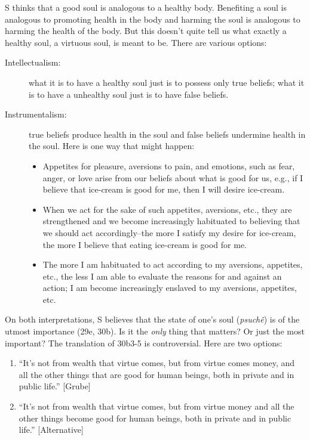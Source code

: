 \documentclass[oneside]{article}
\begin{document}
S thinks that a good soul is analogous to a healthy body. Benefiting a soul is analogous to promoting health in the body and harming the soul is analogous to harming the health of the body.  But this doesn't quite tell us what exactly a healthy soul, a virtuous soul, is meant to be. There are various options: 
\begin{description}
\item[Intellectualism:] what it is to have a healthy soul just is to possess only true beliefs; what it is to have a unhealthy soul just is to have false beliefs. 
\item[Instrumentalism:] true beliefs produce health in the soul and false beliefs undermine health in the soul. Here is one way that might happen:
\begin{itemize}
\item Appetites  for pleasure, aversions to pain, and emotions, such as fear, anger, or love arise from our beliefs about what is good for us, e.g., if I believe that ice-cream is good for me, then I will desire ice-cream. 
\item When we act for the sake of such appetites, aversions, etc., they are strengthened and we become increasingly habituated to believing that we should act accordingly--the  more I satisfy my desire for ice-cream, the more I believe that eating ice-cream is good for me.
\item The more I am habituated to act according to my aversions, appetites, etc., the less I am able to evaluate the reasons for and against an action; I am become increasingly enslaved to my aversions, appetites, etc. 
\end{itemize}
\end{description}
On both interpretations, S believes that the state of one's soul (\emph{psuch\^{e}}) is of the utmost importance (29e, 30b). Is it the \emph{only} thing that matters? Or just the most important? The translation of 30b3-5 is controversial. Here are two options:
\begin{enumerate}
\item ``It's not from wealth that virtue comes, but from virtue comes money, and all the other things that are good for human beings, both in private and in public life.'' [Grube]
\item  ``It's not from wealth that virtue comes, but from virtue money and all the other things become good for human beings, both in private and in public life.'' [Alternative]
\end{enumerate}
\end{document}
